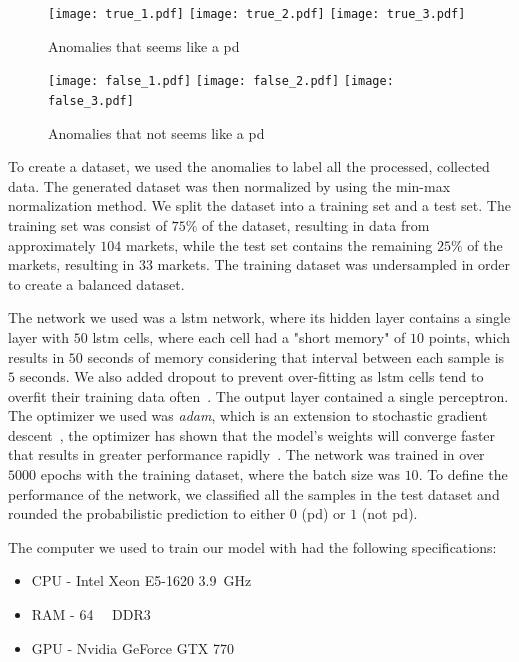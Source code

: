 \begin{figure}
    \centering
    \texttt{[image: true\_1.pdf]}
    \texttt{[image: true\_2.pdf]}
    \texttt{[image: true\_3.pdf]}
    \caption{Anomalies that seems like a \ac{pd}}
    \label{fig:label_true}
\end{figure}

\begin{figure}
    \centering
    \texttt{[image: false\_1.pdf]}
    \texttt{[image: false\_2.pdf]}
    \texttt{[image: false\_3.pdf]}
    \caption{Anomalies that not seems like a \ac{pd}}
    \label{fig:label_false}
\end{figure}

To create a dataset, we used the anomalies to label all the processed, collected data. The generated dataset was then normalized by using the min-max normalization method. We split the dataset into a training set and a test set. The training set was consist of $75\%$ of the dataset, resulting in data from approximately $104$ markets, while the test set contains the remaining $25\%$ of the markets, resulting in $33$ markets. The training dataset was undersampled in order to create a balanced dataset.

The network we used was a \ac{lstm} network, where its hidden layer contains a single layer with $50$ \ac{lstm} cells, where each cell had a "short memory" of $10$ points, which results in $50$ seconds of memory considering that interval between each sample is $5$ seconds. We also added dropout to prevent over-fitting as \ac{lstm} cells tend to overfit their training data often~\cite{overfit}. The output layer contained a single perceptron. The optimizer we used was \emph{adam}, which is an extension to stochastic gradient descent~\cite{kingma2014adam}, the optimizer has shown that the model's weights will converge faster that results in greater performance rapidly~\cite{adam}. The network was trained in over $5000$ epochs with the training dataset, where the batch size was $10$. To define the performance of the network, we classified all the samples in the test dataset and rounded the probabilistic prediction to either $0$ (\ac{pd}) or $1$ (not \ac{pd}). 

The computer we used to train our model with had the following specifications:
\begin{itemize}
    \item CPU - Intel Xeon E5-1620 \SI{3.9}{\giga\hertz}
    \item RAM - \SI{64}{\gibi\byte} DDR3 
    \item GPU - Nvidia GeForce GTX 770
\end{itemize}
\newpage


